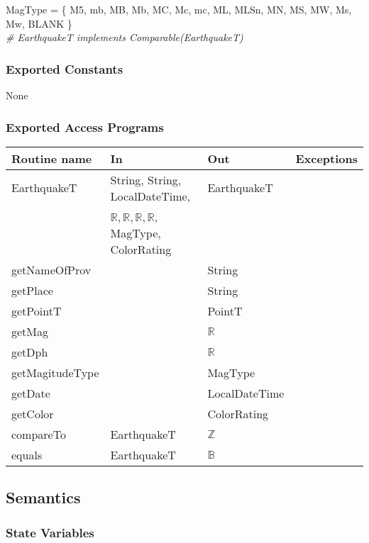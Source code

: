 \documentclass[12pt]{article}
\begin{document}
\noindent MagType = \{ M5, mb, MB, Mb, MC, Mc, mc, ML, MLSn, MN, MS, MW, Ms, Mw, BLANK \}\\

\noindent \textit{\# EarthquakeT implements Comparable(EarthquakeT)}

\subsubsection* {Exported Constants}

None

\subsubsection* {Exported Access Programs}

\begin{tabular}{| l | l | l | l |}
\hline
\textbf{Routine name} & \textbf{In} & \textbf{Out} & \textbf{Exceptions}\\
\hline
EarthquakeT & String, String, LocalDateTime, & EarthquakeT &\\
\hhline{|~|~|~|}
~ &$\mathbb{R}, \mathbb{R}, \mathbb{R}, \mathbb{R}$, MagType, ColorRating & ~ &\\
\hline
getNameOfProv & ~ & String & \\
\hline
getPlace & ~ & String & \\
\hline
getPointT & ~ & PointT & \\
\hline
getMag & ~ & $\mathbb{R}$ & \\
\hline
getDph & ~ & $\mathbb{R}$ & \\
\hline
getMagitudeType & ~ & MagType & \\
\hline
getDate & ~ & LocalDateTime & \\
\hline
getColor & ~ & ColorRating & \\
\hline
compareTo & EarthquakeT & $\mathbb{Z}$ & \\
\hline
equals & EarthquakeT & $\mathbb{B}$ & \\
\hline
\end{tabular}

\newpage

\subsection* {Semantics}

\subsubsection* {State Variables}
\end{document}
